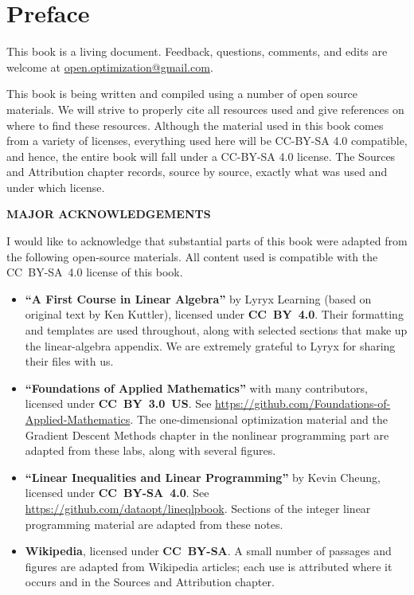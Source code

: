 
\chapter*{Preface}

This book is a living document.  Feedback, questions, comments, and edits are welcome at \href{mailto:open.optimization@gmail.com}{open.optimization@gmail.com}.

This book is being written and compiled using a number of open source materials.   We will strive to properly cite all resources used and give references on where to find these resources.  Although the material used in this book comes from a variety of licenses, everything used here will be CC-BY-SA 4.0 compatible, and hence, the entire book will fall under a CC-BY-SA 4.0 license.  The Sources and Attribution chapter records, source by source, exactly what was used and under which license.

\begin{center}
\fontsize{14pt}{16pt}\selectfont\textcolor{titletextcolour}{\textbf{MAJOR ACKNOWLEDGEMENTS}}
\end{center}

I would like to acknowledge that substantial parts of this book were adapted from the following open-source materials.
All content used is compatible with the CC~BY-SA~4.0 license of this book.

\begin{itemize}
\item \textbf{``A First Course in Linear Algebra''} by Lyryx Learning (based on original text by Ken Kuttler), licensed under \textbf{CC~BY~4.0}.  Their formatting and templates are used throughout, along with selected sections that make up the linear-algebra appendix.  We are extremely grateful to Lyryx for sharing their files with us.

\item \textbf{``Foundations of Applied Mathematics''} with many contributors, licensed under \textbf{CC~BY~3.0~US}.  See \url{https://github.com/Foundations-of-Applied-Mathematics}.  The one-dimensional optimization material and the Gradient Descent Methods chapter in the nonlinear programming part are adapted from these labs, along with several figures.

\item \textbf{``Linear Inequalities and Linear Programming''} by Kevin Cheung, licensed under \textbf{CC~BY-SA~4.0}.  See \url{https://github.com/dataopt/lineqlpbook}.  Sections of the integer linear programming material are adapted from these notes.

\item \textbf{Wikipedia}, licensed under \textbf{CC~BY-SA}.  A small number of passages and figures are adapted from Wikipedia articles; each use is attributed where it occurs and in the Sources and Attribution chapter.
\end{itemize}

